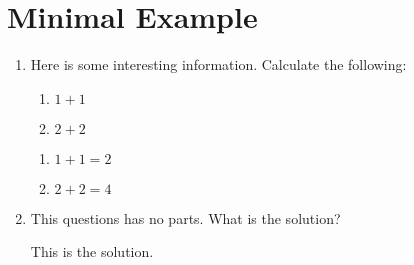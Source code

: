 \documentclass{article}
\begin{document}
\section*{Minimal Example}

\hrulefill

\medskip

\begin{enumerate}

\item Here is some interesting information. Calculate the following:

\begin{enumerate}
    \item $1+1$
    \item $2+2$
\end{enumerate}

\begin{solution}
    \begin{enumerate}
        \item $1+1=2$
        \item $2+2=4$
    \end{enumerate}
\end{solution}

\item This questions has no parts. What is the solution?

\begin{solution}
    This is the solution.
\end{solution}

\end{enumerate}
\end{document}
